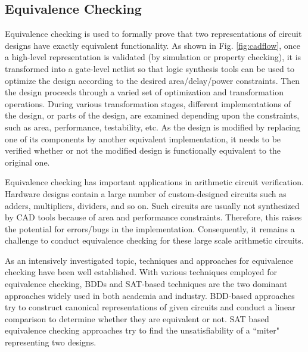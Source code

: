 \subsection{Equivalence Checking}
Equivalence checking is used to formally prove that two representations of
circuit designs have exactly equivalent functionality.  As shown in
Fig. \ref{fig:cadflow}, once a high-level representation is validated
(by simulation or property checking),  it is transformed into a
gate-level netlist so that logic synthesis tools can be used to
optimize the design according to the desired area/delay/power
constraints. Then the design proceeds through a varied set of 
optimization and transformation operations. During various
transformation stages, different  implementations of the design, or
parts of the design, are examined depending upon the constraints, such
as area, performance, testability, etc. As the design is modified by
replacing one of its components  by another equivalent implementation,
it needs to be verified whether or not the modified design is
functionally equivalent to the original one.

Equivalence checking has important applications in arithmetic circuit
verification. Hardware designs contain a large number of
custom-designed circuits such as adders, multipliers, dividers, and so 
on. Such circuits are usually not synthesized by CAD tools because of
area and performance constraints. Therefore, this raises the potential
for errors/bugs in the implementation. Consequently, it remains a
challenge to conduct equivalence checking for these large scale
arithmetic circuits. 

As an intensively investigated topic, techniques and approaches for
equivalence checking have been well established.  
With various techniques employed for equivalence checking, BDDs and
SAT-based techniques are the two dominant approaches widely used in
both academia and industry. BDD-based approaches try to construct 
canonical representations of given circuits and conduct a linear
comparison to determine whether they are equivalent or not. SAT based
equivalence checking approaches try to find the unsatisfiability of a
``miter" representing two designs. 

